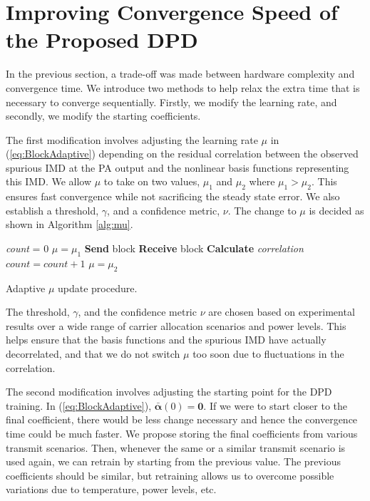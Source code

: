 \section{Improving Convergence Speed of the Proposed DPD}
\label{sec:ConvergenceSpeed}
In the previous section, a trade-off was made between hardware complexity and convergence time. We introduce two methods to help relax the extra time that is necessary to converge sequentially. Firstly, we modify the learning rate, and secondly, we modify the starting coefficients.

The first modification involves adjusting the learning rate $\mu$ in (\ref{eq:BlockAdaptive}) depending on the residual correlation between the observed spurious IMD at the PA output and the nonlinear basis functions representing this IMD. We allow $\mu$ to take on two values, $\mu_1$ and $\mu_2$ where $\mu_1 > \mu_2$. This ensures fast convergence while not sacrificing the steady state error. We also establish a threshold, $\gamma$, and a confidence metric, $\nu$. The change to $\mu$ is decided as shown in Algorithm \ref{alg:mu}.
\begin{algorithm}[h]
\SetAlgoLined
\textit{count} = 0\;
$\mu = \mu_1$\;
 {
  \textbf{Send} block\;
  \textbf{Receive} block\;
  \textbf{Calculate} \textit{correlation}\;
  {
   $count = count + 1$\; 
  }
  {
   $\mu = \mu_2$\; 
  }
 }
\caption{Adaptive $\mu$ update procedure.}
\label{alg:mu}
\end{algorithm}
The threshold, $\gamma$, and the confidence metric $\nu$ are chosen based on experimental results over a wide range of carrier allocation scenarios and power levels. This helps ensure that the basis functions and the spurious IMD have actually decorrelated, and that we do not switch $\mu$ too soon due to fluctuations in the correlation.

The second modification involves adjusting the starting point for the DPD training. In  (\ref{eq:BlockAdaptive}), $\bar{\boldsymbol{\alpha}}(0) = \mathbf{0}$. If we were to start closer to the final coefficient, there would be less change necessary and hence the convergence time could be much faster.  We propose storing the final coefficients from various transmit scenarios. Then, whenever the same or a similar transmit scenario is used again, we can retrain by starting from the previous value. 
The previous coefficients should be similar, but retraining allows us to overcome possible variations due to temperature, power levels, etc. 

